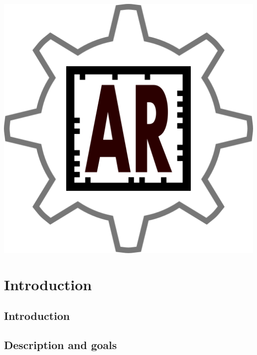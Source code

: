 \documentclass[BSP,english,oneside]{classes/gucthesis}
\begin{document}


\makefrontpages

\clearpage
\includegraphics[width=\textwidth]{includes/logo}
\thispagestyle{empty}

\clearpage
\setcounter{page}{1}



\tableofcontents
\listoffigures
\listoftables

\newpage
\setcounter{page}{1}
\part{Introduction}
	
	\chapter{Introduction}
		\setcounter{page}{2}	%
		\label{chap:introduction}
		

	\chapter{Description and goals}
		\label{chap:description_goals}
		
\end{document}
